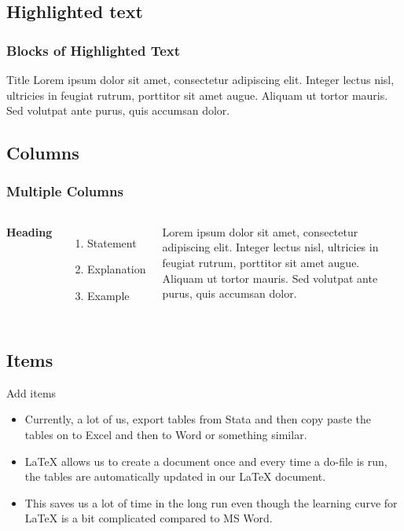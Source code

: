 \documentclass[aspectratio=169]{beamer} %
\begin{document}
\subsection{Highlighted text}
\begin{frame}
\frametitle{Blocks of Highlighted Text}
\begin{block}{Title}
	Lorem ipsum dolor sit amet, consectetur adipiscing elit. Integer lectus nisl, ultricies in feugiat rutrum, porttitor sit amet augue. Aliquam ut tortor mauris. Sed volutpat ante purus, quis accumsan dolor.
\end{block}


\end{frame}

\subsection{Columns}
\begin{frame}
\frametitle{Multiple Columns}
\begin{columns}[c] %

	\textbf{Heading}
	\begin{enumerate}
		\item Statement
		\item Explanation
		\item Example
	\end{enumerate}

	Lorem ipsum dolor sit amet, consectetur adipiscing elit. Integer lectus nisl, ultricies in feugiat rutrum, porttitor sit amet augue. Aliquam ut tortor mauris. Sed volutpat ante purus, quis accumsan dolor.

\end{columns}
\end{frame}

\subsection{Items}
\begin{frame}{Add items}

\begin{itemize}
	\item Currently, a lot of us, export tables from Stata and then copy paste the tables on to Excel and then to Word or something similar.
	\item {\LaTeX} allows us to create a document once and every time a do-file is run, the tables are automatically updated in our {\LaTeX} document.
	\item This saves us a lot of time in the long run even though the learning curve for {\LaTeX} is a bit complicated compared to MS Word.

\end{itemize}
\end{frame}
\end{document}
